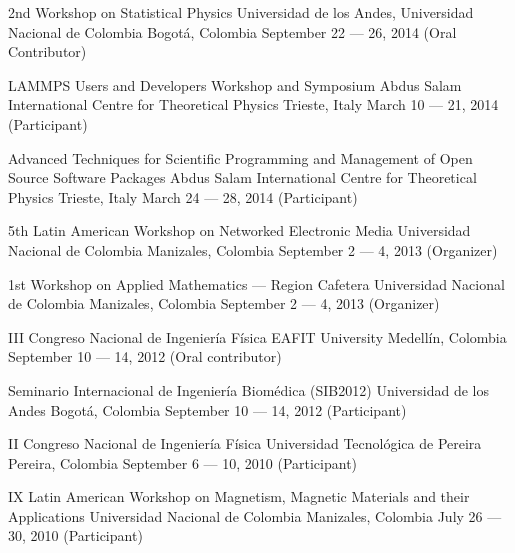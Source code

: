 \documentclass[12pt,english]{moderncv}
\begin{document}
        {2nd Workshop on Statistical Physics}
        {Universidad de los Andes, Universidad Nacional de Colombia}
        {Bogotá, Colombia}
        {September 22 --- 26, 2014}
        {(Oral Contributor)}

        {LAMMPS Users and Developers Workshop and Symposium}
        {Abdus Salam International Centre for Theoretical Physics}
        {Trieste, Italy}
        {March 10 --- 21, 2014}
        {(Participant)}

        {%
            Advanced Techniques for Scientific Programming and Management
            of Open Source Software Packages
        }
        {Abdus Salam International Centre for Theoretical Physics}
        {Trieste, Italy}
        {March 24 --- 28, 2014}
        {(Participant)}

        {5th Latin American Workshop on Networked Electronic Media}
        {Universidad Nacional de Colombia}
        {Manizales, Colombia}
        {September 2 --- 4, 2013}
        {(Organizer)}


        {1st Workshop on Applied Mathematics --- Region Cafetera}
        {Universidad Nacional de Colombia}
        {Manizales, Colombia}
        {September 2 --- 4, 2013}
        {(Organizer)}

        {III Congreso Nacional de Ingeniería Física}
        {EAFIT University}
        {Medellín, Colombia}
        {September 10 --- 14, 2012}
        {(Oral contributor)}

        {Seminario Internacional de Ingeniería Biomédica (SIB2012)}
        {Universidad de los Andes}
        {Bogotá, Colombia}
        {September 10 --- 14, 2012}
        {(Participant)}

        {II Congreso Nacional de Ingeniería Física}
        {Universidad Tecnol\'ogica de Pereira}
        {Pereira, Colombia}
        {September 6 --- 10, 2010}
        {(Participant)}

        {IX Latin American Workshop on Magnetism, Magnetic Materials and their Applications}
        {Universidad Nacional de Colombia}
        {Manizales, Colombia}
        {July 26 --- 30, 2010}
        {(Participant)}
\end{document}
